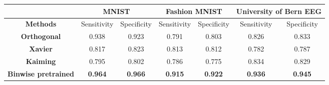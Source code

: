 \documentclass{article}
\begin{document}
\begin{table}[]
	\begin{tabular}{c|c|c|c|c|c|c|}
		\cline{2-7}
		& \multicolumn{2}{c|}{\textbf{MNIST}} & \multicolumn{2}{c|}{\textbf{Fashion MNIST}} & \multicolumn{2}{c|}{\textbf{University of Bern EEG}} \\ \hline
		\multicolumn{1}{|c|}{\textbf{Methods}}            & Sensitivity      & Specificity      & Sensitivity          & Specificity          & Sensitivity               & Specificity              \\ \hline
		\multicolumn{1}{|c|}{\textbf{Orthogonal}}         & 0.938            & 0.923            & 0.791                & 0.803                & 0.826                     & 0.833                    \\ \hline
		\multicolumn{1}{|c|}{\textbf{Xavier}}             & 0.817            & 0.823            & 0.813                & 0.812                & 0.782                     & 0.787                    \\ \hline
		\multicolumn{1}{|c|}{\textbf{Kaiming}}            & 0.795            & 0.802            & 0.786                & 0.775                & 0.834                     & 0.829                    \\ \hline
		\multicolumn{1}{|c|}{\textbf{Binwise pretrained}} & \textbf{0.964}   & \textbf{0.966}   & \textbf{0.915}       & \textbf{0.922}       & \textbf{0.936}            & \textbf{0.945}           \\ \hline
	\end{tabular}
\end{table}
\\
\end{document}
